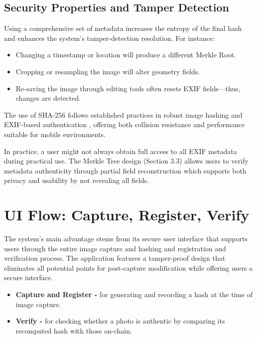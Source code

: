 \subsection{Security Properties and Tamper Detection}
Using a comprehensive set of metadata increases the entropy of the final hash and enhances the system’s tamper-detection resolution. For instance:
\begin{itemize}
    \item Changing a timestamp or location will produce a different Merkle Root.
    \item Cropping or resampling the image will alter geometry fields.
    \item Re-saving the image through editing tools often resets EXIF fields—thus, changes are detected.
\end{itemize}

The use of SHA-256 follows established practices in robust image hashing \cite{robustImageHashing} and EXIF-based authentication \cite{authenticationOfDigitalImageExifMetadata}, offering both collision resistance and performance suitable for mobile environments.


In practice, a user might not always obtain full access to all EXIF metadata during practical use. The Merkle Tree design (Section 3.3) allows users to verify metadata authenticity through partial field reconstruction which supports both privacy and usability by not revealing all fields.

\section{UI Flow: Capture, Register, Verify}
The system's main advantage stems from its secure user interface that supports users through the entire image capture and hashing and registration and verification process. The application features a tamper-proof design that eliminates all potential points for post-capture modification while offering users a secure interface.

\begin{itemize}
    \item {\textbf{Capture and Register -}} for generating and recording a hash at the time of image capture.
    \item {\textbf{Verify -}} for checking whether a photo is authentic by comparing its recomputed hash with those on-chain.
\end{itemize}

